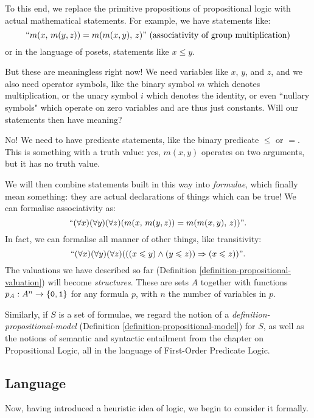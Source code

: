 \documentclass{article}
\begin{document}
To this end, we replace the primitive propositions of propositional logic with actual mathematical statements. For example, we have statements like:
\[
``m(x, \, m(y, z)) = m(m(x, y), \, z)" \text{ (associativity of group multiplication)}
\]
or in the language of posets, statements like $x \leq y$.

But these are meaningless right now! We need variables like $x$, $y$, and $z$, and we also need operator symbols, like the binary symbol $m$ which denotes multiplication, or the unary symbol $i$ which denotes the identity, or even ``nullary symbols" which operate on zero variables and are thus just constants. Will our statements then have meaning?

No!  We need to have predicate statements, like the binary predicate $\leq$ or $=$. This is something with a truth value: yes, $m(x, y)$ operates on two arguments, but it has no truth value.

We will then combine statements built in this way into \textit{formulae}, which finally mean something: they are actual declarations of things which can be true! We can formalise associativity as:
\[
``(\forall x)(\forall y)(\forall z)(m(x, \, m(y, z)) = m(m(x, y), \, z))".
\]
In fact, we can formalise all manner of other things, like transitivity:
\[
``(\forall x)(\forall y)(\forall z)(((x \leqslant y) \land (y \leqslant z)) \Rightarrow (x \leqslant z))".
\]
The valuations we have described so far (Definition \ref{definition-propositional-valuation}) will become \textit{structures}. These are sets $A$ together with functions $p_A: A^n \to \left\lbrace \texttt{0}, \texttt{1} \right\rbrace$ for any formula $p$, with $n$ the number of variables in $p$.

Similarly, if $S$ is a set of formulae, we regard the notion of a \textit{definition-propositional-model} (Definition \ref{definition-propositional-model}) for $S$, as well as the notions of semantic and syntactic entailment from the chapter on Propositional Logic, all in the language of First-Order Predicate Logic.


\subsection{Language}
\label{section-first-order-language}

Now, having introduced a heuristic idea of logic, we begin to consider it formally.
\end{document}
